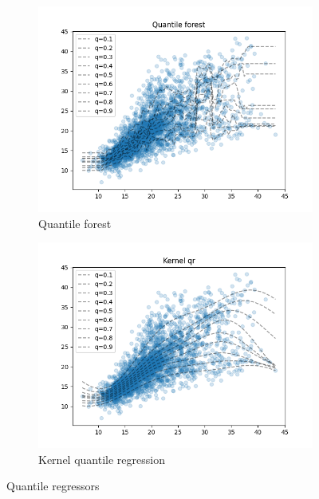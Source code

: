 \begin{figure}
\begin{subfigure}[b]{0.5\linewidth}
      \vspace{4ex}
    \end{subfigure} 
    \begin{subfigure}[b]{0.5\linewidth}
      \centering
      \includegraphics[width=1.1\textwidth]{images/melbourne_quantile_forest.png} 
      \caption{Quantile forest} 
      \label{fig:melbourne_quantile_forest} 
    \end{subfigure}%
    \begin{subfigure}[b]{0.5\linewidth}
      \centering
      \includegraphics[width=1.1\textwidth]{images/melborune_kernel_quantile_regression.png} 
      \caption{Kernel quantile regression} 
      \label{fig:melborune_kernel_quantile_regression} 
    \end{subfigure} 
    \caption{Quantile regressors}
    \label{fig:melbourne_quantiles_comparison} 
  \end{figure}

